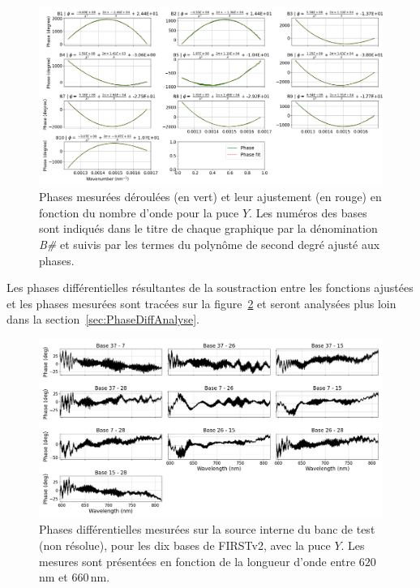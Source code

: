 \begin{figure}[ht!]
    \centering
    \includegraphics[width=\figwidth]{Figure_Chap3/20221010_Bin01_PhaseFit_Pola1_BaseSubplot_LaTex.png}
    \caption[Phases mesurées et ajustées en fonction du nombre d'onde sur la puce $Y$.]{Phases mesurées déroulées (en vert) et leur ajustement (en rouge) en fonction du nombre d'onde pour la puce $Y$. Les numéros des bases sont indiqués dans le titre de chaque graphique par la dénomination \textit{B\#} et suivis par les termes du polynôme de second degré ajusté aux phases.}
    \label{fig:FitPhaseVis}
\end{figure}

Les phases différentielles résultantes de la soustraction entre les fonctions ajustées et les phases mesurées sont tracées sur la figure~\ref{fig:PhaseDiffEx} et seront analysées plus loin dans la section~\ref{sec:PhaseDiffAnalyse}.

\begin{figure}[ht!]
    \centering
    \includegraphics[width=\figwidth]{Figure_Chap4/20221010_SpeDiffPhase_BaseSubplot_Pola1_LaTex.png}
    \caption[Phases différentielles mesurées sur la source interne du banc de test.]{Phases différentielles mesurées sur la source interne du banc de test (non résolue), pour les dix bases de FIRSTv2, avec la puce $Y$. Les mesures sont présentées en fonction de la longueur d'onde entre $620 \,$nm et $660 \,$nm.}
    \label{fig:PhaseDiffEx}
\end{figure}



